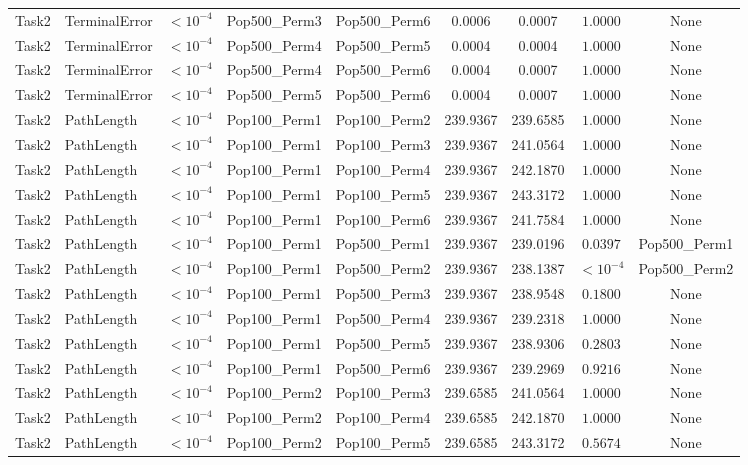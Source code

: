 \documentclass[8pt]{article}
\begin{document}
\begin{longtable}{llccccccc}
Task2 & TerminalError & $< 10^{-4}$ & Pop500\_Perm3 & Pop500\_Perm6 & 0.0006 & 0.0007 & $1.0000$ & None \\
Task2 & TerminalError & $< 10^{-4}$ & Pop500\_Perm4 & Pop500\_Perm5 & 0.0004 & 0.0004 & $1.0000$ & None \\
Task2 & TerminalError & $< 10^{-4}$ & Pop500\_Perm4 & Pop500\_Perm6 & 0.0004 & 0.0007 & $1.0000$ & None \\
Task2 & TerminalError & $< 10^{-4}$ & Pop500\_Perm5 & Pop500\_Perm6 & 0.0004 & 0.0007 & $1.0000$ & None \\
Task2 & PathLength & $< 10^{-4}$ & Pop100\_Perm1 & Pop100\_Perm2 & 239.9367 & 239.6585 & $1.0000$ & None \\
Task2 & PathLength & $< 10^{-4}$ & Pop100\_Perm1 & Pop100\_Perm3 & 239.9367 & 241.0564 & $1.0000$ & None \\
Task2 & PathLength & $< 10^{-4}$ & Pop100\_Perm1 & Pop100\_Perm4 & 239.9367 & 242.1870 & $1.0000$ & None \\
Task2 & PathLength & $< 10^{-4}$ & Pop100\_Perm1 & Pop100\_Perm5 & 239.9367 & 243.3172 & $1.0000$ & None \\
Task2 & PathLength & $< 10^{-4}$ & Pop100\_Perm1 & Pop100\_Perm6 & 239.9367 & 241.7584 & $1.0000$ & None \\
Task2 & PathLength & $< 10^{-4}$ & Pop100\_Perm1 & Pop500\_Perm1 & 239.9367 & 239.0196 & $0.0397$ & Pop500\_Perm1 \\
Task2 & PathLength & $< 10^{-4}$ & Pop100\_Perm1 & Pop500\_Perm2 & 239.9367 & 238.1387 & $< 10^{-4}$ & Pop500\_Perm2 \\
Task2 & PathLength & $< 10^{-4}$ & Pop100\_Perm1 & Pop500\_Perm3 & 239.9367 & 238.9548 & $0.1800$ & None \\
Task2 & PathLength & $< 10^{-4}$ & Pop100\_Perm1 & Pop500\_Perm4 & 239.9367 & 239.2318 & $1.0000$ & None \\
Task2 & PathLength & $< 10^{-4}$ & Pop100\_Perm1 & Pop500\_Perm5 & 239.9367 & 238.9306 & $0.2803$ & None \\
Task2 & PathLength & $< 10^{-4}$ & Pop100\_Perm1 & Pop500\_Perm6 & 239.9367 & 239.2969 & $0.9216$ & None \\
Task2 & PathLength & $< 10^{-4}$ & Pop100\_Perm2 & Pop100\_Perm3 & 239.6585 & 241.0564 & $1.0000$ & None \\
Task2 & PathLength & $< 10^{-4}$ & Pop100\_Perm2 & Pop100\_Perm4 & 239.6585 & 242.1870 & $1.0000$ & None \\
Task2 & PathLength & $< 10^{-4}$ & Pop100\_Perm2 & Pop100\_Perm5 & 239.6585 & 243.3172 & $0.5674$ & None \\

\end{longtable}
\end{document}
